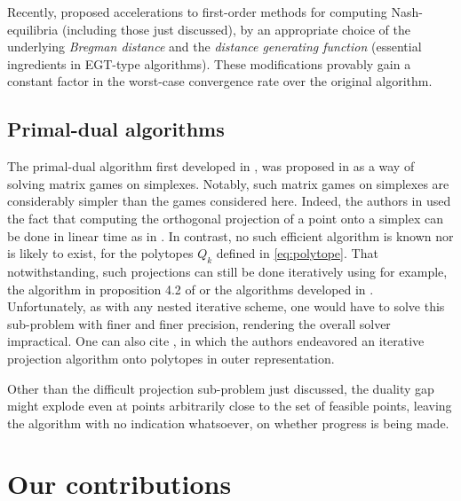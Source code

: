 \documentclass{article}
\DeclareMathOperator{\proj}{proj}
\begin{document}
Recently, \cite{kroer2015} proposed accelerations to first-order
methods for computing Nash-equilibria (including those just
discussed), by an appropriate choice of the underlying \textit{Bregman
distance} and the \textit{distance generating function} (essential
ingredients in EGT-type algorithms). These modifications provably
gain a constant factor in the worst-case convergence rate over the
original algorithm. %

\subsection{Primal-dual algorithms}
The primal-dual algorithm first developed in \cite{chambolle2010}, was
proposed in \cite{chambolle2014ergodic} as a way of solving matrix
games on simplexes. Notably, such matrix games on
simplexes are considerably simpler than the games considered
here. Indeed, the authors in \cite{chambolle2014ergodic} used the fact
that computing the orthogonal projection of a point onto a simplex can
be done in linear time as in \cite{duchi2008efficient}. In contrast,
no such efficient algorithm is known nor is likely to exist, for the
polytopes $Q_k$ defined in \eqref{eq:polytope}. %
That notwithstanding, such projections can still be done iteratively
using for example, the algorithm in proposition 4.2 of
\cite{combettes2010dualization} or the algorithms developed in
\cite{tran2015splitting}. Unfortunately, as with any nested iterative
scheme, one would have to solve this sub-problem with finer and finer
precision, rendering the overall solver impractical. One can also cite
\cite{nurminski2008}, in which the authors endeavored an iterative
projection algorithm onto polytopes in outer representation.

Other than the difficult projection sub-problem just discussed,
the duality gap might explode even at points arbitrarily
 close to the set of feasible points, leaving the algorithm with no
 indication whatsoever, on whether progress is being made.

 
\section{Our contributions}
\label{sec:gsp}
\end{document}
